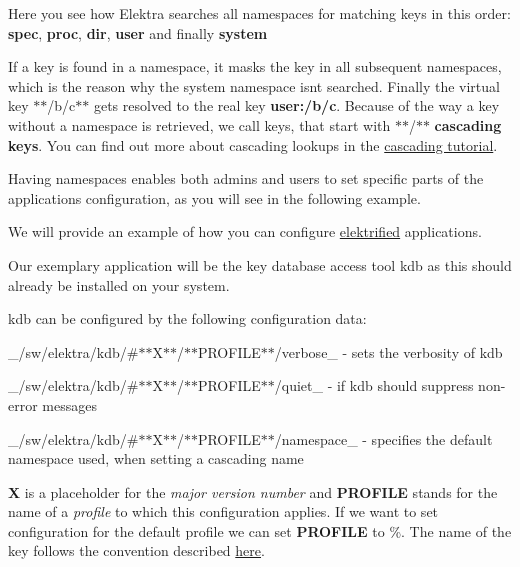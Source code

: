 Here you see how Elektra searches all namespaces for matching keys in this order\+: {\bfseries spec}, {\bfseries proc}, {\bfseries dir}, {\bfseries user} and finally {\bfseries system}

If a key is found in a namespace, it masks the key in all subsequent namespaces, which is the reason why the system namespace isn\textquotesingle{}t searched. Finally the virtual key $\ast$$\ast$/b/c$\ast$$\ast$ gets resolved to the real key {\bfseries user\+:/b/c}. Because of the way a key without a namespace is retrieved, we call keys, that start with \textquotesingle{}$\ast$$\ast$/$\ast$$\ast$\textquotesingle{} {\bfseries cascading keys}. You can find out more about cascading lookups in the \hyperlink{doc_tutorials_cascading_md}{cascading tutorial}.

Having namespaces enables both admins and users to set specific parts of the application\textquotesingle{}s configuration, as you will see in the following example.

We will provide an example of how you can configure \hyperlink{doc_help_elektra-glossary_md}{elektrified} applications.

Our exemplary application will be the key database access tool {\ttfamily kdb} as this should already be installed on your system.

{\ttfamily kdb} can be configured by the following configuration data\+:


\begin{DoxyItemize}
\item \+\_\+/sw/elektra/kdb/\#$\ast$$\ast$\+X$\ast$$\ast$/$\ast$$\ast$\+P\+R\+O\+F\+I\+L\+E$\ast$$\ast$/verbose\+\_\+ -\/ sets the verbosity of kdb
\item \+\_\+/sw/elektra/kdb/\#$\ast$$\ast$\+X$\ast$$\ast$/$\ast$$\ast$\+P\+R\+O\+F\+I\+L\+E$\ast$$\ast$/quiet\+\_\+ -\/ if kdb should suppress non-\/error messages
\item \+\_\+/sw/elektra/kdb/\#$\ast$$\ast$\+X$\ast$$\ast$/$\ast$$\ast$\+P\+R\+O\+F\+I\+L\+E$\ast$$\ast$/namespace\+\_\+ -\/ specifies the default namespace used, when setting a cascading name
\end{DoxyItemize}

{\bfseries X} is a placeholder for the {\itshape major version number} and {\bfseries P\+R\+O\+F\+I\+LE} stands for the name of a {\itshape profile} to which this configuration applies. If we want to set configuration for the default profile we can set {\bfseries P\+R\+O\+F\+I\+LE} to \%. The name of the key follows the convention described \hyperlink{doc_help_elektra-key-names_md}{here}.

